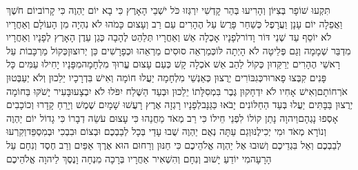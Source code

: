 \documentclass[../main/main.tex]{subfiles}
\begin{document}
\begin{multicols}{\ncols}
תִּקְעוּ שׁוֹפָר בְּצִיּוֹן וְהָרִיעוּ בְּהַר קָדְשִׁי יִרְגְּזוּ כֹּל יֹשְׁבֵי הָאָרֶץ כִּי בָא יוֹם יַהְוֶה כִּי קָרוֹב\PreVerseSpace{}יוֹם חֹשֶׁךְ וַאֲפֵלָה יוֹם עָנָן וַעֲרָפֶל כְּשַׁחַר פָּרֻשׂ עַל הֶהָרִים עַם רַב וְעָצוּם כָּמֹהוּ לֹא נִהְיָה מִן הָעוֹלָם וְאַחֲרָיו לֹא יוֹסֵף עַד שְׁנֵי דּוֹר וָדוֹר\PreVerseSpace{}לְפָנָיו אָכְלָה אֵשׁ וְאַחֲרָיו תְּלַהֵט לֶהָבָה כְּגַן עֵדֶן הָאָרֶץ לְפָנָיו וְאַחֲרָיו מִדְבַּר שְׁמָמָה וְגַם פְּלֵיטָה לֹא הָיְתָה לּוֹ\PreVerseSpace{}כְּמַרְאֵה סוּסִים מַרְאֵהוּ וּכְפָרָשִׁים כֵּן יְרוּצוּן\PreVerseSpace{}כְּקוֹל מַרְכָּבוֹת עַל רָאשֵׁי הֶהָרִים יְרַקֵּדוּן כְּקוֹל לַהַב אֵשׁ אֹכְלָה קָשׁ כְּעַם עָצוּם עֱרוּךְ מִלְחָמָה\PreVerseSpace{}מִפָּנָיו יָחִילוּ עַמִּים כָּל פָּנִים קִבְּצוּ פָארוּר\PreVerseSpace{}כְּגִבּוֹרִים יְרֻצוּן כְּאַנְשֵׁי מִלְחָמָה יַעֲלוּ חוֹמָה וְאִישׁ בִּדְרָכָיו יֵלֵכוּן וְלֹא יְעַבְּטוּן אֹרְחוֹתָם\PreVerseSpace{}וְאִישׁ אָחִיו לֹא יִדְחָקוּן גֶּבֶר בִּמְסִלָּתוֹ יֵלֵכוּן וּבְעַד הַשֶּׁלַח יִפֹּלוּ לֹא יִבְצָעוּ\PreVerseSpace{}בָּעִיר יָשֹׁקּוּ בַּחוֹמָה יְרֻצוּן בַּבָּתִּים יַעֲלוּ בְּעַד הַחַלּוֹנִים יָבֹאוּ כַּגַּנָּב\PreVerseSpace{}לְפָנָיו רָגְזָה אֶרֶץ רָעֲשׁוּ שָׁמָיִם שֶׁמֶשׁ וְיָרֵחַ קָדָרוּ וְכוֹכָבִים אָסְפוּ נָגְהָם\PreVerseSpace{}וַיהוָה נָתַן קוֹלוֹ לִפְנֵי חֵילוֹ כִּי רַב מְאֹד מַחֲנֵהוּ כִּי עָצוּם עֹשֵׂה דְבָרוֹ כִּי גָדוֹל יוֹם יַהְוֶה וְנוֹרָא מְאֹד וּמִי יְכִילֶנּוּ\PreVerseSpace{}וְגַם עַתָּה נְאֻם יַהְוֶה שֻׁבוּ עָדַי בְּכָל לְבַבְכֶם וּבְצוֹם וּבִבְכִי וּבְמִסְפֵּד\PreVerseSpace{}וְקִרְעוּ לְבַבְכֶם וְאַל בִּגְדֵיכֶם וְשׁוּבוּ אֶל יַהְוֶה אֱלֹהֵיכֶם כִּי חַנּוּן וְרַחוּם הוּא אֶרֶךְ אַפַּיִם וְרַב חֶסֶד וְנִחָם עַל הָרָעָה\PreVerseSpace{}מִי יוֹדֵעַ יָשׁוּב וְנִחָם וְהִשְׁאִיר אַחֲרָיו בְּרָכָה מִנְחָה וָנֶסֶךְ לַיהוָה אֱלֹהֵיכֶם\OpenSection{}\par

\end{multicols}
\end{document}
